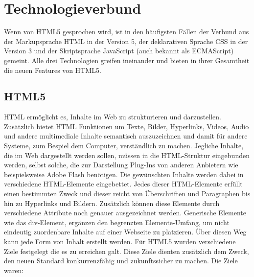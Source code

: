 \section{Technologieverbund}
Wenn von HTML5 gesprochen wird, ist in den häufigsten Fällen der Verbund
aus der Markupsprache HTML in der Version 5, der deklarativen Sprache
CSS in der Version 3 und der Skriptsprache JavaScript (auch bekannt
als ECMAScript) gemeint. Alle drei Technologien greifen ineinander und
bieten in ihrer Gesamtheit die neuen Features von HTML5.

\subsection{HTML5}
HTML ermöglicht es, Inhalte im Web zu strukturieren und darzustellen.
Zusätzlich bietet HTML Funktionen um Texte, Bilder, Hyperlinks,
Videos, Audio und andere multimediale Inhalte semantisch auszuzeichnen
und damit für andere Systeme, zum Bespiel dem Computer, verständlich
zu machen. Jegliche Inhalte, die im Web dargestellt werden sollen, müssen
in die HTML-Struktur eingebunden werden, selbst solche, die zur Darstellung
Plug-Ins von anderen Anbietern wie beispielsweise Adobe Flash benötigen.
\newline\newline
Die gewünschten Inhalte werden dabei in verschiedene HTML-Elemente
eingebettet. Jedes dieser HTML-Elemente erfüllt einen bestimmten Zweck und
dieser reicht von Überschriften und Paragraphen bis hin zu Hyperlinks und
Bildern. Zusätzlich können diese Elemente durch verschiedene Attribute noch
genauer ausgezeichnet werden. Generische Elemente wie das div-Element,
ergänzen den begrenzten Elemente-Umfang, um nicht eindeutig zuordenbare
Inhalte auf einer Webseite zu platzieren. Über diesen Weg kann jede
Form von Inhalt erstellt werden.
\newline\newline
Für HTML5 wurden verschiedene Ziele festgelegt die es zu erreichen galt.
Diese Ziele dienten zusätzlich dem Zweck, den neuen Standard konkurrenzfähig
und zukunftssicher zu machen. Die Ziele waren:
